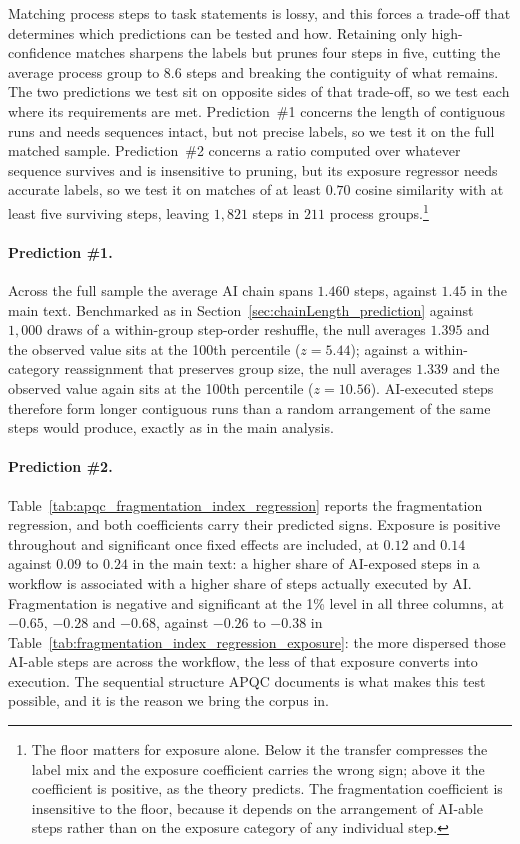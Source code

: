 Matching process steps to task statements is lossy, and this forces a trade-off that determines which
predictions can be tested and how.
Retaining only high-confidence matches sharpens the labels but prunes four steps in five, cutting the average
process group to $8.6$ steps and breaking the contiguity of what remains.
The two predictions we test sit on opposite sides of that trade-off, so we test each where its requirements
are met.
Prediction~\#1 concerns the length of contiguous runs and needs sequences intact, but not precise labels, so
we test it on the full matched sample.
Prediction~\#2 concerns a ratio computed over whatever sequence survives and is insensitive to pruning, but
its exposure regressor needs accurate labels, so we test it on matches of at least $0.70$ cosine similarity
with at least five surviving steps, leaving $1{,}821$ steps in $211$ process groups.\footnote{The floor matters
for exposure alone. Below it the transfer compresses the label mix and the exposure coefficient carries the
wrong sign; above it the coefficient is positive, as the theory predicts. The fragmentation coefficient is
insensitive to the floor, because it depends on the arrangement of AI-able steps rather than on the exposure
category of any individual step.}

\paragraph{Prediction \#1.}
Across the full sample the average AI chain spans $1.460$ steps, against $1.45$ in the main text.
Benchmarked as in Section~\ref{sec:chainLength_prediction} against $1{,}000$ draws of a within-group
step-order reshuffle, the null averages $1.395$ and the observed value sits at the 100th percentile
($z = 5.44$); against a within-category reassignment that preserves group size, the null averages $1.339$ and
the observed value again sits at the 100th percentile ($z = 10.56$).
AI-executed steps therefore form longer contiguous runs than a random arrangement of the same steps would
produce, exactly as in the main analysis.

\paragraph{Prediction \#2.}
Table~\ref{tab:apqc_fragmentation_index_regression} reports the fragmentation regression, and both
coefficients carry their predicted signs.
Exposure is positive throughout and significant once fixed effects are included, at $0.12$ and $0.14$ against
$0.09$ to $0.24$ in the main text: a higher share of AI-exposed steps in a workflow is associated with a higher
share of steps actually executed by AI.
Fragmentation is negative and significant at the 1\% level in all three columns, at $-0.65$, $-0.28$ and
$-0.68$, against $-0.26$ to $-0.38$ in Table~\ref{tab:fragmentation_index_regression_exposure}: the more
dispersed those AI-able steps are across the workflow, the less of that exposure converts into execution.
The sequential structure APQC documents is what makes this test possible, and it is the reason we bring the
corpus in.

